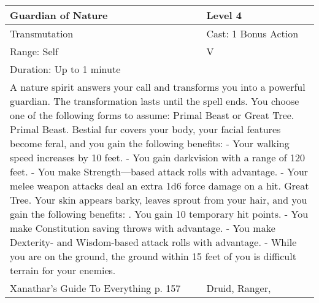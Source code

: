 \documentclass[11pt]{report}
\begin{document}
\begin{table}[H]
	\begin{tabular}{||p{6cm}|p{6cm}||}
		\hline\hline
		\bf{Guardian of Nature} & Level 4\\ \hline
		Transmutation & Cast: 1 Bonus Action\\ \hline
		Range: Self & V\\ \hline
		Duration: Up to 1 minute & \\ \hline
		\multicolumn{2}{||p{12cm}||}{A nature spirit answers your call and transforms you into a powerful guardian. The transformation lasts until the spell ends. You choose one of the following forms to assume: Primal Beast or Great Tree.
Primal Beast. Bestial fur covers your body, your facial features become feral, and you gain the following benefits:
- Your walking speed increases by 10 feet.
- You gain darkvision with a range of 120 feet.
- You make Strength—based attack rolls with advantage.
- Your melee weapon attacks deal an extra 1d6 force damage on a hit.
Great Tree. Your skin appears barky, leaves sprout from your hair, and you gain the following benefits:
. You gain 10 temporary hit points.
- You make Constitution saving throws with advantage.
- You make Dexterity- and Wisdom-based attack rolls with advantage.
- While you are on the ground, the ground within 15 feet of you is difficult terrain for your enemies.}\\ \hline
Xanathar's Guide To Everything p. 157 & Druid, Ranger, \\ \hline\hline
	\end{tabular}
\end{table}
\end{document}
